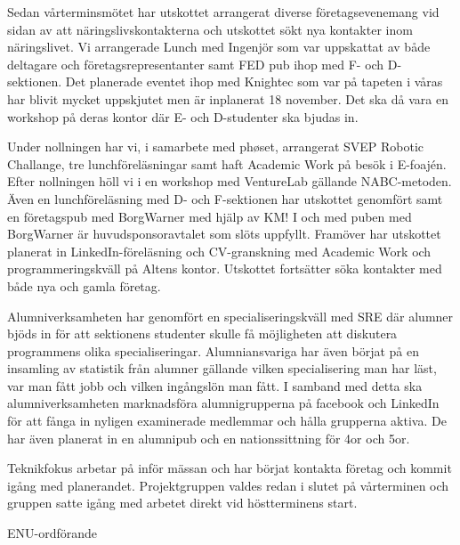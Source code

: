 \documentclass[../_main/handlingar.tex]{subfiles}
\begin{document}
\vspace{8px}


Sedan vårterminsmötet har utskottet arrangerat diverse företagsevenemang vid sidan av att näringslivskontakterna och utskottet sökt nya kontakter inom näringslivet. Vi arrangerade Lunch med Ingenjör som var uppskattat av både deltagare och företagsrepresentanter samt FED pub ihop med F- och D-sektionen. Det planerade eventet ihop med Knightec som var på tapeten i våras har blivit mycket uppskjutet men är inplanerat 18 november. Det ska då vara en workshop på deras kontor där E- och D-studenter ska bjudas in. 

Under nollningen har vi, i samarbete med phøset, arrangerat SVEP Robotic Challange, tre lunchföreläsningar samt haft Academic Work på besök i E-foajén. Efter nollningen höll vi i en workshop med VentureLab gällande NABC-metoden. Även en lunchföreläsning med D- och F-sektionen har utskottet genomfört samt en företagspub med BorgWarner med hjälp av KM! I och med puben med BorgWarner är huvudsponsoravtalet som slöts uppfyllt. Framöver har utskottet planerat in LinkedIn-föreläsning och CV-granskning med Academic Work och programmeringskväll på Altens kontor. Utskottet fortsätter söka kontakter med både nya och gamla företag.

Alumniverksamheten har genomfört en specialiseringskväll med SRE där alumner bjöds in för att sektionens studenter skulle få möjligheten att diskutera programmens olika specialiseringar. Alumniansvariga har även börjat på en insamling av statistik från alumner gällande vilken specialisering man har läst, var man fått jobb och vilken ingångslön man fått. I samband med detta ska alumniverksamheten marknadsföra alumnigrupperna på facebook och LinkedIn för att fånga in nyligen examinerade medlemmar och hålla grupperna aktiva. De har även planerat in en alumnipub och en nationssittning för 4or och 5or.

Teknikfokus arbetar på inför mässan och har börjat kontakta företag och kommit igång med planerandet. Projektgruppen valdes redan i slutet på vårterminen och gruppen satte igång med arbetet direkt vid höstterminens start.


\begin{signatures}{1}
    \mvh
    \signature{Jakob Pettersson}{ENU-ordförande}
\end{signatures}
\end{document}
